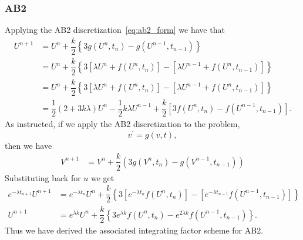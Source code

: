 \documentclass[12pt]{article}
\begin{document}
\subsubsection*{AB2}
Applying the AB2 discretization~\eqref{eq:ab2_form} we have that
\begin{subequations}
    \begin{align}
        U^{n+1} &= U^{n} + \dfrac{k}{2}\left\{3g(U^{n},t_{n})-g(U^{n-1},t_{n-1})\right\}\\
        &= U^{n} + \dfrac{k}{2}\left\{3\left[\lambda U^{n} + f(U^{n},t_{n})\right]-\left[\lambda U^{n-1} + f(U^{n},t_{n-1})\right]\right\}\\
        &= U^{n} + \dfrac{k}{2}\left\{3\left[\lambda U^{n} + f(U^{n},t_{n})\right]-\left[\lambda U^{n-1} + f(U^{n},t_{n-1})\right]\right\}\\
        &= \dfrac{1}{2}(2+3k\lambda)U^{n} - \dfrac{1}{2}k\lambda U^{n-1} + \dfrac{k}{2}\left[3f(U^{n},t_{n})-f(U^{n-1},t_{n-1})\right].
    \end{align}
\end{subequations}
As instructed, if we apply the AB2 discretization to the problem, \[ v^{\prime} = g(v,t),\] then we have
\begin{align}
    V^{n+1} &= V^{n} + \dfrac{k}{2}\left(3g(V^{n},t_{n})-g(V^{n-1},t_{n-1})\right)
\end{align}
Substituting back for $u$ we get
\begin{subequations}
    \begin{align}
    e^{-\lambda t_{n+1}}U^{n+1} &= e^{-\lambda t_{n}}U^{n} + \dfrac{k}{2}\left\{3\left[e^{-\lambda t_{n}}f(U^{n},t_{n})\right]-\left[e^{-\lambda t_{n-1}}f(U^{n-1},t_{n-1})\right]\right\}\\
    U^{n+1} &= e^{\lambda k}U^{n} + \dfrac{k}{2}\left\{3e^{\lambda k}f(U^{n},t_{n})-e^{2\lambda k}f(U^{n-1},t_{n-1})\right\}.
    \end{align}
\end{subequations}
Thus we have derived the associated integrating factor scheme for AB2. 
\end{document}
